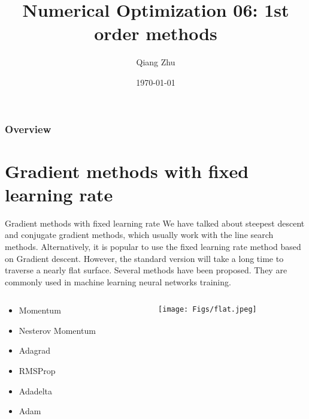 \documentclass{beamer}
\title[Gradient Descent]{Numerical Optimization 06: 1st order methods} %
\author{Qiang Zhu} %
\institute[University of Nevada Las Vegas] %
{
University of Nevada Las Vegas\\ %
\medskip
}
\date{\today} %
\begin{document}
\begin{frame}
\titlepage %
\end{frame}

\begin{frame}
\frametitle{Overview} %
\tableofcontents %
\end{frame}


\section{Gradient methods with fixed learning rate}
\begin{frame}{Gradient methods with fixed learning rate}
We have talked about steepest descent and conjugate gradient methods, which usually work with the line search methods. Alternatively, it is popular to use the fixed learning rate method based on Gradient descent. However, the standard version will take a long time to traverse a nearly flat surface.
Several methods have been proposed. They are commonly used in machine learning neural networks training.
\begin{columns}
\begin{column}{.4\textwidth}
\begin{itemize}
    \item Momentum
    \item Nesterov Momentum
    \item Adagrad
    \item RMSProp
    \item Adadelta
    \item Adam
\end{itemize}
\end{column}

\begin{column}{.6\textwidth}
\begin{figure}
\centering
\texttt{[image: Figs/flat.jpeg]}
\end{figure}
\end{column}
\end{columns}
\end{frame}
\end{document}
